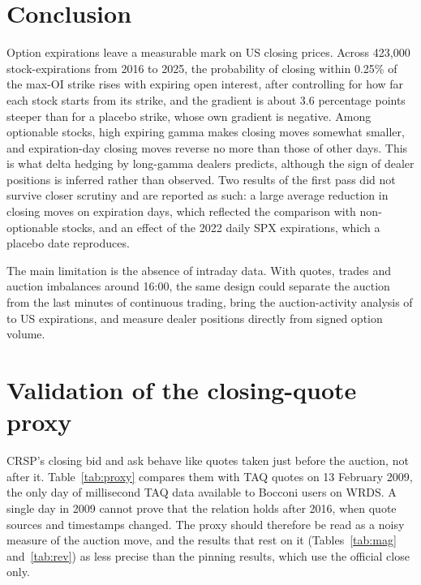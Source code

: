 \documentclass[11pt,a4paper]{article}
\begin{document}
\section{Conclusion}

Option expirations leave a measurable mark on US closing prices. Across 423,000 stock-expi\-rations from 2016 to 2025, the probability of closing within 0.25\% of the max-OI strike rises with expiring open interest, after controlling for how far each stock starts from its strike, and the gradient is about 3.6 percentage points steeper than for a placebo strike, whose own gradient is negative. Among optionable stocks, high expiring gamma makes closing moves somewhat smaller, and expiration-day closing moves reverse no more than those of other days. This is what delta hedging by long-gamma dealers predicts, although the sign of dealer positions is inferred rather than observed. Two results of the first pass did not survive closer scrutiny and are reported as such: a large average reduction in closing moves on expiration days, which reflected the comparison with non-optionable stocks, and an effect of the 2022 daily SPX expirations, which a placebo date reproduces.

The main limitation is the absence of intraday data. With quotes, trades and auction imbalances around 16:00, the same design could separate the auction from the last minutes of continuous trading, bring the auction-activity analysis of \citet{ComertonFordeRindi2022} to US expirations, and measure dealer positions directly from signed option volume.




\appendix
\section{Validation of the closing-quote proxy}
\label{app:proxy}

CRSP's closing bid and ask behave like quotes taken just before the auction, not after it. Table~\ref{tab:proxy} compares them with TAQ quotes on 13 February 2009, the only day of millisecond TAQ data available to Bocconi users on WRDS. A single day in 2009 cannot prove that the relation holds after 2016, when quote sources and timestamps changed. The proxy should therefore be read as a noisy measure of the auction move, and the results that rest on it (Tables~\ref{tab:mag} and~\ref{tab:rev}) as less precise than the pinning results, which use the official close only.
\end{document}
